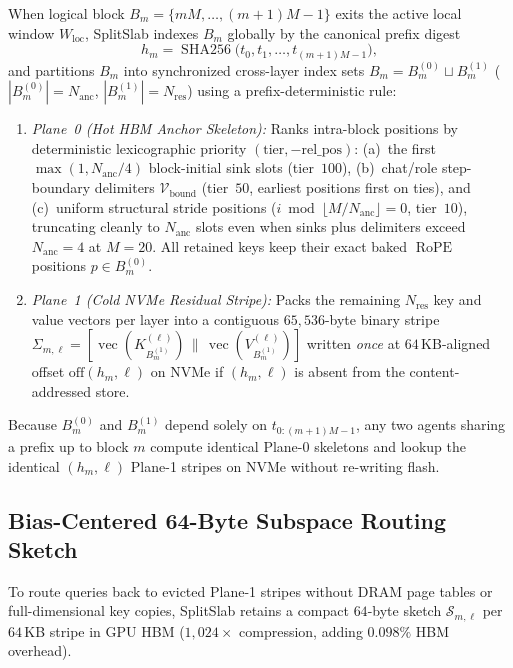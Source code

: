 \documentclass[10pt,journal,compsoc]{IEEEtran}
\theoremstyle{definition}
\theoremstyle{remark}
\newcommand{\SplitSlab}{\textup{\textsc{SplitSlab}}}
\newcommand{\RoPE}{\operatorname{RoPE}}
\def\SplitSlab{SplitSlab}%
\begin{document}
When logical block $B_m = \{mM, \dots, (m+1)M - 1\}$ exits the active local window $W_{\mathrm{loc}}$, \SplitSlab{} indexes $B_m$ globally by the canonical prefix digest
\begin{equation}\label{eq:canon_hash}
h_m = \operatorname{SHA256}\!\big(t_0, t_1, \dots, t_{(m+1)M-1}\big),
\end{equation}
and partitions $B_m$ into synchronized cross-layer index sets $B_m = B_m^{(0)} \sqcup B_m^{(1)}$ ($|B_m^{(0)}| = N_{\mathrm{anc}}$, $|B_m^{(1)}| = N_{\mathrm{res}}$) using a prefix-deterministic rule:
\begin{enumerate}
  \item \emph{Plane~0 (Hot HBM Anchor Skeleton):} Ranks intra-block positions by deterministic lexicographic priority $(\text{tier}, -\text{rel\_pos})$: (a)~the first $\max(1, N_{\mathrm{anc}}/4)$ block-initial sink slots (tier~$100$), (b)~chat/role step-boundary delimiters $\mathcal{V}_{\mathrm{bound}}$ (tier~$50$, earliest positions first on ties), and (c)~uniform structural stride positions ($i \bmod \lfloor M/N_{\mathrm{anc}} \rfloor = 0$, tier~$10$), truncating cleanly to $N_{\mathrm{anc}}$ slots even when sinks plus delimiters exceed $N_{\mathrm{anc}} = 4$ at $M = 20$. All retained keys keep their exact baked $\RoPE$ positions $p \in B_m^{(0)}$.
  \item \emph{Plane~1 (Cold NVMe Residual Stripe):} Packs the remaining $N_{\mathrm{res}}$ key and value vectors per layer into a contiguous $65{,}536$-byte binary stripe $\Sigma_{m,\ell} = [\operatorname{vec}(K_{B_m^{(1)}}^{(\ell)}) \,\|\, \operatorname{vec}(V_{B_m^{(1)}}^{(\ell)})]$ written \emph{once} at $64$\,KB-aligned offset $\mathrm{off}(h_m, \ell)$ on NVMe if $(h_m, \ell)$ is absent from the content-addressed store.
\end{enumerate}

Because $B_m^{(0)}$ and $B_m^{(1)}$ depend solely on $t_{0:(m+1)M-1}$, any two agents sharing a prefix up to block $m$ compute identical Plane-0 skeletons and lookup the identical $(h_m,\ell)$ Plane-1 stripes on NVMe without re-writing flash.

\subsection{Bias-Centered 64-Byte Subspace Routing Sketch}\label{subsec:sketch}

To route queries back to evicted Plane-1 stripes without DRAM page tables or full-dimensional key copies, \SplitSlab{} retains a compact $64$-byte sketch $\mathcal{S}_{m,\ell}$ per $64$\,KB stripe in GPU HBM ($1{,}024\times$ compression, adding $0.098\%$ HBM overhead).
\end{document}
